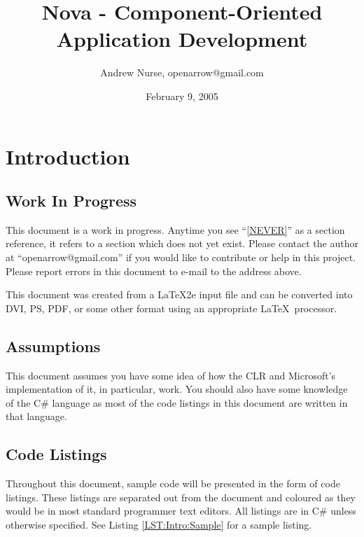 \documentclass[a4paper,12pt]{article}
\begin{document}
\title{Nova - Component-Oriented Application Development}
\author{Andrew Nurse, openarrow@gmail.com}
\date{February 9, 2005}
\maketitle


\section{Introduction}
\label{SEC:Intro}

\subsection{Work In Progress}
\label{SEC:Intro:WIP}
This document is a work in progress. Anytime you see ``\ref{NEVER}'' as a section reference, it refers to a section which does not yet exist. Please contact the author at ``openarrow@gmail.com'' if you would like to contribute or help in this project. Please report errors in this document to e-mail to the address above. 

This document was created from a \LaTeX 2e input file and can be converted into DVI, PS, PDF, or some other format using an appropriate \LaTeX\ processor. 

\subsection{Assumptions}
\label{SEC:Intro:Assumptions}
\label{GLOB:Assumptions}
This document assumes you have some idea of how the CLR and Microsoft's implementation of it, in particular, work. You should also have some knowledge of the C\# language as most of the code listings in this document are written in that language.

\subsection{Code Listings}
\label{SEC:Intro:Listings}
Throughout this document, sample code will be presented in the form of code listings. These listings are separated out from the document and coloured as they would be in most standard programmer text editors. All listings are in C\# unless otherwise specified. See Listing \ref{LST:Intro:Sample} for a sample listing.
\end{document}
